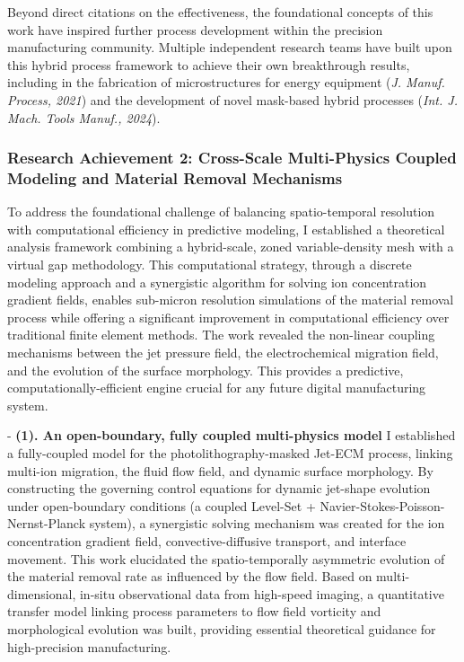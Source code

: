 \documentclass{ResearchStatement}
\begin{document}
Beyond direct citations on the effectiveness, the foundational concepts of this work have inspired further process development within the precision manufacturing community. Multiple independent research teams have built upon this hybrid process framework to achieve their own breakthrough results, including in the fabrication of microstructures for energy equipment (\textit{J. Manuf. Process, 2021}) and the development of novel mask-based hybrid processes (\textit{Int. J. Mach. Tools Manuf., 2024}).


\noindent\makebox[\textwidth][c]{%
    \centering
    
}
\begingroup
{}
\label{fig:citation_method}
\endgroup

\clearpage
\subsubsection{Research Achievement 2: Cross-Scale Multi-Physics Coupled Modeling and Material Removal Mechanisms}
To address the foundational challenge of balancing spatio-temporal resolution with computational efficiency in predictive modeling, I established a theoretical analysis framework combining a hybrid-scale, zoned variable-density mesh with a virtual gap methodology. This computational strategy, through a discrete modeling approach and a synergistic algorithm for solving ion concentration gradient fields, enables sub-micron resolution simulations of the material removal process while offering a significant improvement in computational efficiency over traditional finite element methods. The work revealed the non-linear coupling mechanisms between the jet pressure field, the electrochemical migration field, and the evolution of the surface morphology. This provides a predictive, computationally-efficient engine crucial for any future digital manufacturing system.


- \textbf{(1). An open-boundary, fully coupled multi-physics model}
I established a fully-coupled model for the photolithography-masked Jet-ECM process, linking multi-ion migration, the fluid flow field, and dynamic surface morphology. By constructing the governing control equations for dynamic jet-shape evolution under open-boundary conditions (a coupled Level-Set + Navier-Stokes-Poisson-Nernst-Planck system), a synergistic solving mechanism was created for the ion concentration gradient field, convective-diffusive transport, and interface movement. This work elucidated the spatio-temporally asymmetric evolution of the material removal rate as influenced by the flow field. Based on multi-dimensional, in-situ observational data from high-speed imaging, a quantitative transfer model linking process parameters to flow field vorticity and morphological evolution was built, providing essential theoretical guidance for high-precision manufacturing.
\end{document}
